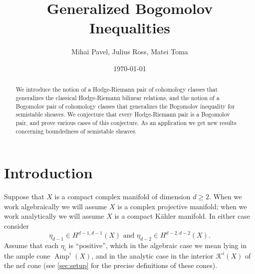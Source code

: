 \documentclass[a4,reqno]{amsart}
\theoremstyle{definition}
\def\cK{\mathcal K}
\DeclareMathOperator{\Amp}{Amp}
\numberwithin{equation}{section}
\begin{document}
\title[]{Generalized Bogomolov Inequalities}


\author{Mihai Pavel, Julius Ross, Matei Toma}

\address{Institute of Mathematics of the Romanian Academy,
P.O. Box 1-764, 014700 Bucharest, Romania
}
\address{Department of Mathematics, Statistics, and Computer Science, University of Illinois at Chicago, 322 Science and Engineering Offices (M/C 249), 851 S. Morgan Street, Chicago, IL 60607
 }
 
\address{ Universit\'e de Lorraine, CNRS, IECL, F-54000 Nancy, France
}




\date{\today}


\begin{abstract} 
We introduce the notion of a Hodge-Riemann pair of cohomology classes that generalizes the classical Hodge-Riemann bilinear relations, and the notion of a Bogomolov pair of cohomology classes that generalizes the Bogomolov inequality for semistable sheaves.  We conjecture that every Hodge-Riemann pair is a Bogomolov pair, and prove various cases of this conjecture.  As an application we get new results concerning boundedness of semistable sheaves. 
\end{abstract}
\maketitle
\setcounter{tocdepth}{1}

\section{Introduction}

Suppose that $X$ is a compact complex manifold of dimension $d\ge 2$. 
When we work algebraically we will assume $X$ is a complex projective manifold; when we work analytically we will assume $X$ is a compact K\"ahler manifold.  In either case consider $$\eta_{d-1}\in H^{d-1,d-1}(X)\text{ and } \eta_{d-2}\in H^{d-2,d-2}(X).$$   Assume that each $\eta_{i}$ is ``positive'', which in the algebraic case we mean lying in the ample cone $\Amp^i(X)$, and in the analytic case in the interior $\cK^i(X)$ of the nef cone (see \cref{sec:setup} for the precise definitions of these cones).
\end{document}
